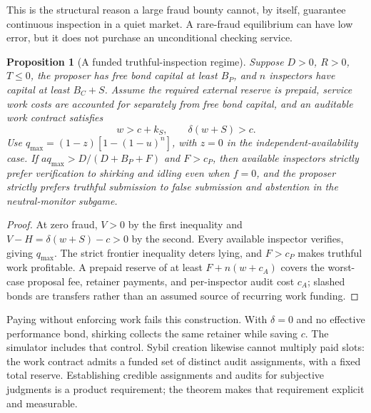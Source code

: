 \documentclass[10pt]{article}
\newtheorem{proposition}{Proposition}
\begin{document}
This is the structural reason a large fraud bounty cannot, by itself, guarantee continuous inspection in a quiet market. A rare-fraud equilibrium can have low error, but it does not purchase an unconditional checking service.

\begin{proposition}[A funded truthful-inspection regime]
\label{prop:paid_inspection}
Suppose $D>0$, $R>0$, $T\leq0$, the proposer has free bond capital at least $B_P$, and $n$ inspectors have capital at least $B_C+S$. Assume the required external reserve is prepaid, service work costs are accounted for separately from free bond capital, and an auditable work contract satisfies
\begin{equation}
w>c+k_S,\qquad \delta(w+S)>c.
\label{eq:work_ic}
\end{equation}
Use $q_{\max}=(1-z)[1-(1-u)^n]$, with $z=0$ in the independent-availability case. If $a q_{\max}>D/(D+B_P+F)$ and $F>c_P$, then available inspectors strictly prefer verification to shirking and idling even when $f=0$, and the proposer strictly prefers truthful submission to false submission and abstention in the neutral-monitor subgame.
\end{proposition}
\begin{proof}
At zero fraud, $V>0$ by the first inequality and $V-H=\delta(w+S)-c>0$ by the second. Every available inspector verifies, giving $q_{\max}$. The strict frontier inequality deters lying, and $F>c_P$ makes truthful work profitable. A prepaid reserve of at least $F+n(w+c_A)$ covers the worst-case proposal fee, retainer payments, and per-inspector audit cost $c_A$; slashed bonds are transfers rather than an assumed source of recurring work funding.
\end{proof}

Paying without enforcing work fails this construction. With $\delta=0$ and no effective performance bond, shirking collects the same retainer while saving $c$. The simulator includes that control. Sybil creation likewise cannot multiply paid slots: the work contract admits a funded set of distinct audit assignments, with a fixed total reserve. Establishing credible assignments and audits for subjective judgments is a product requirement; the theorem makes that requirement explicit and measurable.
\end{document}
